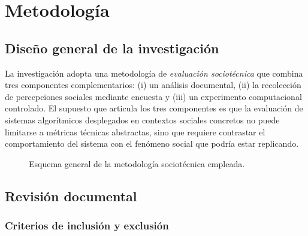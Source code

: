\chapter{Metodología}
\label{cap:metodologia}

\section{Diseño general de la investigación}
\label{sec:diseno-general}

La investigación adopta una metodología de \emph{evaluación sociotécnica} que
combina tres componentes complementarios: (i) un análisis documental, (ii) la
recolección de percepciones sociales mediante encuesta y (iii) un experimento
computacional controlado. El supuesto que articula los tres componentes es
que la evaluación de sistemas algorítmicos desplegados en contextos sociales
concretos no puede limitarse a métricas técnicas abstractas, sino que requiere
contrastar el comportamiento del sistema con el fenómeno social que podría
estar replicando.

\begin{figure}[H]
  \centering
  \caption[Esquema general de la metodología sociotécnica.]{Esquema general
  de la metodología sociotécnica empleada.}
  \label{fig:flujo-metodologico}
\end{figure}

\section{Revisión documental}
\label{sec:revision-documental}

\subsection{Criterios de inclusión y exclusión}

